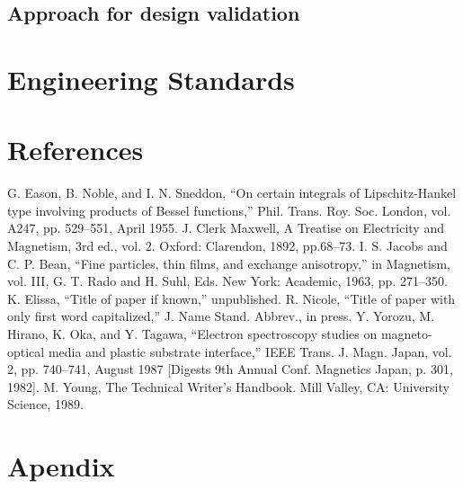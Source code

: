 \documentclass[11pt]{article}
\begin{document}
\subsection{Approach for design validation} \label{Approch for design validation}
\section{Engineering Standards}\label{Engineering Standards}
\section{References}
\begin{thebibliography}{00}
     G. Eason, B. Noble, and I. N. Sneddon, ``On certain integrals of Lipschitz-Hankel type involving products of Bessel functions,'' Phil. Trans. Roy. Soc. London, vol. A247, pp. 529--551, April 1955.
     J. Clerk Maxwell, A Treatise on Electricity and Magnetism, 3rd ed., vol. 2. Oxford: Clarendon, 1892, pp.68--73.
     I. S. Jacobs and C. P. Bean, ``Fine particles, thin films, and exchange anisotropy,'' in Magnetism, vol. III, G. T. Rado and H. Suhl, Eds. New York: Academic, 1963, pp. 271--350.
     K. Elissa, ``Title of paper if known,'' unpublished.
     R. Nicole, ``Title of paper with only first word capitalized,'' J. Name Stand. Abbrev., in press.
     Y. Yorozu, M. Hirano, K. Oka, and Y. Tagawa, ``Electron spectroscopy studies on magneto-optical media and plastic substrate interface,'' IEEE Trans. J. Magn. Japan, vol. 2, pp. 740--741, August 1987 [Digests 9th Annual Conf. Magnetics Japan, p. 301, 1982].
     M. Young, The Technical Writer's Handbook. Mill Valley, CA: University Science, 1989.
    \end{thebibliography}
    


\section{Apendix}




\vspace{12pt}
\end{document}
